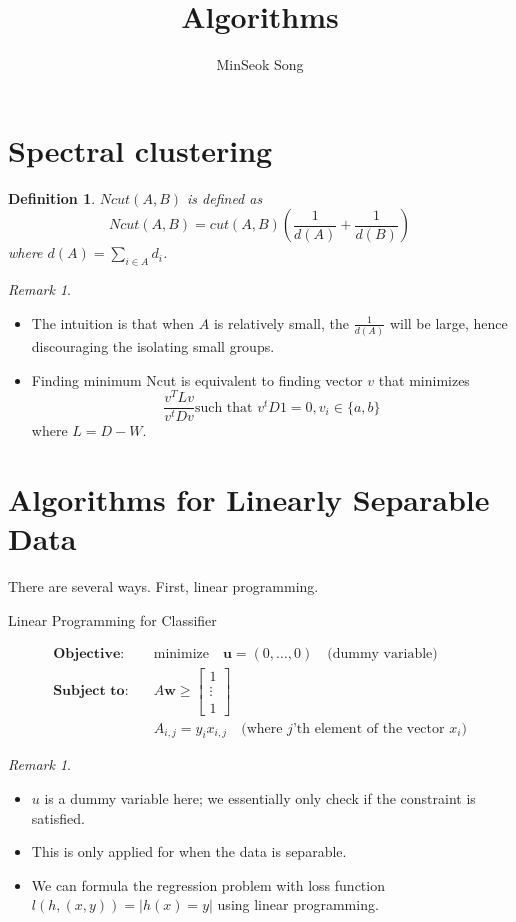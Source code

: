 \documentclass{article}
\title{Algorithms}
\author{MinSeok Song}
\date{}
\newtheorem{definition}{Definition}
\theoremstyle{remark}
\newtheorem{remark}[example]{Remark}
\begin{document}
\maketitle
\section*{Spectral clustering}
\begin{definition}
$Ncut(A,B)$ is defined as $$Ncut(A,B) = cut(A,B)(\frac 1{d(A)}+\frac 1{d(B)})$$ where $d(A)=\sum_{i\in A}d_i$.
\end{definition}
\begin{remark}
\begin{itemize}
\item The intuition is that when $A$ is relatively small, the $\frac 1{d(A)}$ will be large, hence discouraging the isolating small groups.
\item Finding minimum Ncut is equivalent to finding vector $v$ that minimizes $$\frac{v^T Lv}{v^tDv}\text{such that }v^tD1=0,v_i\in\{a,b\}$$ where 
$L=D-W$.

\end{itemize}
\end{remark}

\section*{Algorithms for Linearly Separable Data}
There are several ways. First, linear programming.
\begin{algorithm}[H]
        \caption{Linear Programming for Classifier}
        \begin{align*}
        \textbf{Objective:} \quad & \text{minimize} \quad \mathbf{u} = (0, \ldots, 0) \quad \text{(dummy variable)} \\
        \textbf{Subject to:} \quad & A\mathbf{w} \geq \begin{bmatrix} 1 \\ \vdots \\ 1 \end{bmatrix} \\
        & A_{i,j} = y_i x_{i,j} \quad \text{(where \(j\)'th element of the vector \(x_i\))}
\end{align*}
\end{algorithm}
\begin{remark}
\begin{itemize}
\item $u$ is a dummy variable here; we essentially only check if the constraint is satisfied.
\item This is only applied for when the data is separable.
\item We can formula the regression problem with loss function $l(h, (x,y))=\lvert h(x)=y\rvert$ using linear programming.
\end{itemize}
\end{remark}
\end{document}
